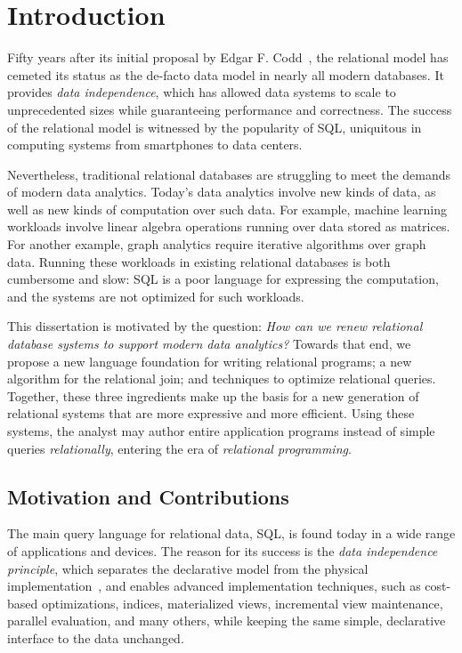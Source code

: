 \chapter{Introduction}
\label{sec:intro}

Fifty years after its initial proposal by Edgar F. Codd~\cite{DBLP:journals/cacm/Codd70},
 the relational model has cemeted its status as the de-facto data model 
 in nearly all modern databases.
It provides {\em data independence}, 
 which has allowed data systems to scale to unprecedented sizes
 while guaranteeing performance and correctness.
The success of the relational model is witnessed 
 by the popularity of SQL, 
 uniquitous in computing systems 
 from smartphones to data centers.

 Nevertheless, traditional relational databases are struggling 
  to meet the demands of modern data analytics.
Today's data analytics involve new kinds of data, 
 as well as new kinds of computation over such data. 
For example, machine learning workloads involve linear algebra operations
 running over data stored as matrices. 
For another example, graph analytics require iterative algorithms
 over graph data.
Running these workloads in existing relational databases 
 is both cumbersome and slow:
 SQL is a poor language for expressing the computation,
 and the systems are not optimized for such workloads.

This dissertation is motivated by the question: 
{\em How can we renew relational database systems 
 to support modern data analytics?}
Towards that end, we propose a new language foundation
 for writing relational programs;
 a new algorithm for the relational join;
 and techniques to optimize relational queries. 
Together, these three ingredients make up 
 the basis for a new generation of relational systems
 that are more expressive and more efficient.
Using these systems,
 the analyst may author entire application programs
 instead of simple queries {\em relationally},
 entering the era of {\em relational programming}.

\section{Motivation and Contributions}
\label{sec:intro:motivation}

The main query language for relational data, SQL, 
 is found today in a wide range of applications and
 devices. 
The reason for its success is the {\em data
  independence principle}, which separates the declarative model from
the physical implementation~\cite{DBLP:journals/cacm/Codd70}, and
enables advanced implementation techniques, such as cost-based
optimizations, indices, materialized views, incremental view
maintenance, parallel evaluation, and many others, while keeping the
same simple, declarative interface to the data unchanged.

